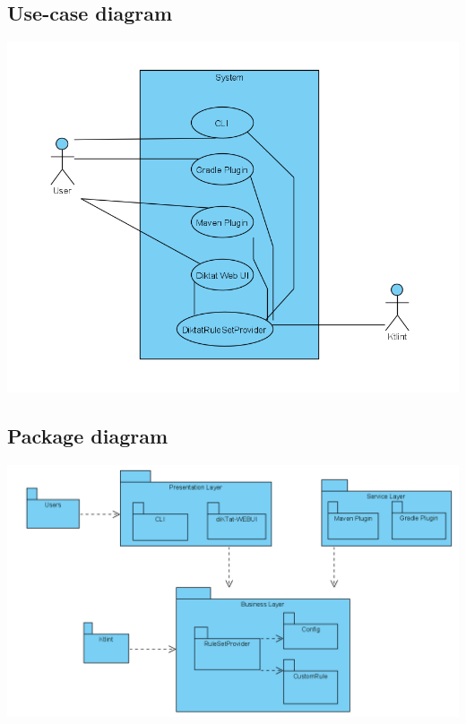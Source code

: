 \subsection{Use-case diagram}
    \includegraphics[scale=0.8]{pictures/useCase.png}
\subsection{Package diagram}
    \includegraphics[scale=0.65]{pictures/package.png}

